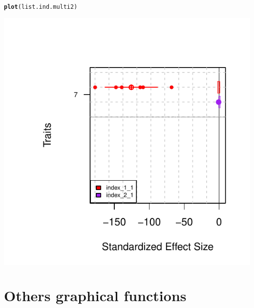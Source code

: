 \documentclass[12pt]{article}\usepackage[]{graphicx}\usepackage[]{color}
\makeatletter
\def\maxwidth{ %
  \ifdim\Gin@nat@width>\linewidth
    \linewidth
  \else
    \Gin@nat@width
  \fi
}
\newcommand{\hlstd}[1]{\textcolor[rgb]{0.345,0.345,0.345}{#1}}%
\newcommand{\hlkwd}[1]{\textcolor[rgb]{0.737,0.353,0.396}{\textbf{#1}}}%
\newenvironment{kframe}{%
 \def\at@end@of@kframe{}%
 \ifinner\ifhmode%
  \def\at@end@of@kframe{\end{minipage}}%
  \begin{minipage}{\columnwidth}%
 \fi\fi%
 \def\FrameCommand##1{\hskip\@totalleftmargin \hskip-\fboxsep
 \colorbox{shadecolor}{##1}\hskip-\fboxsep
     \hskip-\linewidth \hskip-\@totalleftmargin \hskip\columnwidth}%
 \MakeFramed {\advance\hsize-\width
   \@totalleftmargin\z@ \linewidth\hsize
   \@setminipage}}%
 {\par\unskip\endMakeFramed%
 \at@end@of@kframe}
\newenvironment{knitrout}{}{} %
\makeatother
\begin{document}
\begin{knitrout}
\color{fgcolor}\begin{kframe}
\begin{alltt}
\hlkwd{plot}\hlstd{(list.ind.multi2)}
\end{alltt}
\end{kframe}
\includegraphics[width=\maxwidth]{figure/unnamed-chunk-62-1} 

\end{knitrout}

\section{Others graphical functions}
\end{document}
